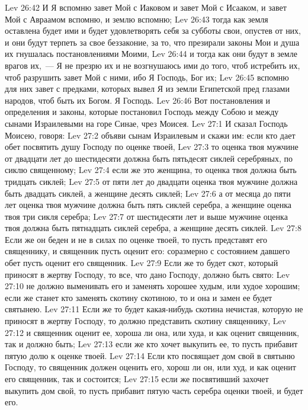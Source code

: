 \vs Lev 26:42 И Я вспомню завет Мой с Иаковом и завет Мой с Исааком, и завет Мой с Авраамом вспомню, и землю вспомню;
\vs Lev 26:43 тогда как земля оставлена будет ими и будет удовлетворять себя за субботы свои, опустев от них, и они будут терпеть за свое беззаконие, за то, что презирали законы Мои и душа их гнушалась постановлениями Моими,
\vs Lev 26:44 и тогда как они будут в земле врагов их,~--- Я не презрю их и не возгнушаюсь ими до того, чтоб истребить их, чтоб разрушить завет Мой с ними, ибо Я Господь, Бог их;
\vs Lev 26:45 вспомню для них завет с предками, которых вывел Я из земли Египетской пред глазами народов, чтоб быть их Богом. Я Господь.
\rsbpar\vs Lev 26:46 Вот постановления и определения и законы, которые постановил Господь между Собою и между сынами Израилевыми на горе Синае, чрез Моисея.
\vs Lev 27:1 И сказал Господь Моисею, говоря:
\vs Lev 27:2 объяви сынам Израилевым и скажи им: если кто дает обет посвятить душу Господу по оценке твоей,
\vs Lev 27:3 то оценка твоя мужчине от двадцати лет до шестидесяти должна быть пятьдесят сиклей серебряных, по сиклю священному;
\vs Lev 27:4 если же это женщина, то оценка твоя должна быть тридцать сиклей;
\vs Lev 27:5 от пяти лет до двадцати оценка твоя мужчине должна быть двадцать сиклей, а женщине десять сиклей;
\vs Lev 27:6 а от месяца до пяти лет оценка твоя мужчине должна быть пять сиклей серебра, а женщине оценка твоя три сикля серебра;
\vs Lev 27:7 от шестидесяти лет и выше мужчине оценка твоя должна быть пятнадцать сиклей серебра, а женщине десять сиклей.
\vs Lev 27:8 Если же он беден и не в силах  по оценке твоей, то пусть представят его священнику, и священник пусть оценит его: соразмерно с состоянием давшего обет пусть оценит его священник.
\vs Lev 27:9 Если же то будет скот, который приносят в жертву Господу, то все, что дано Господу, должно быть свято:
\vs Lev 27:10 не должно выменивать его и заменять хорошее худым, или худое хорошим; если же станет кто заменять скотину скотиною, то и она и замен ее будет святынею.
\vs Lev 27:11 Если же то будет какая-нибудь скотина нечистая, которую не приносят в жертву Господу, то должно представить скотину священнику,
\vs Lev 27:12 и священник оценит ее, хороша ли она, или худа, и как оценит священник, так и должно быть;
\vs Lev 27:13 если же кто хочет выкупить ее, то пусть прибавит пятую долю к оценке твоей.
\vs Lev 27:14 Если кто посвящает дом свой в святыню Господу, то священник должен оценить его, хорош ли он, или худ, и как оценит его священник, так и состоится;
\vs Lev 27:15 если же посвятивший захочет выкупить дом свой, то пусть прибавит пятую часть серебра оценки твоей, и  будет его.
